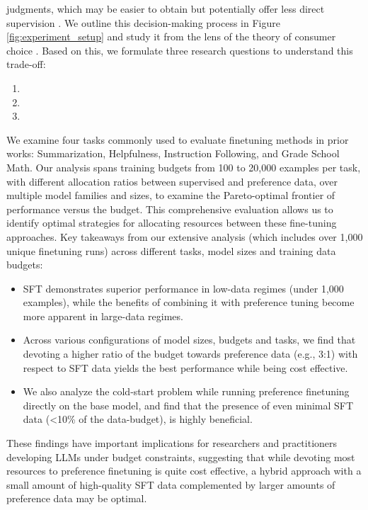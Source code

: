 judgments, which may be easier to obtain but potentially offer less direct supervision \citep{bai2022traininghelpfulharmlessassistant}. We outline this decision-making process in Figure \ref{fig:experiment_setup} and study it from the lens of the theory of consumer choice \citep{0458bef5-f1a5-33b9-8a87-02cfef6aa798, 721839b0-7fd6-3496-8a6f-a05763670acd}. Based on this, we formulate three research questions to understand this trade-off:

\begin{enumerate}
    \item \RQOne
    \item \RQTwo
    \item \RQThree
\end{enumerate}

We examine four tasks commonly used to evaluate finetuning methods in prior works: Summarization, Helpfulness, Instruction Following, and Grade School Math. Our analysis spans training budgets from 100 to 20,000 examples per task, with different allocation ratios between supervised and preference data, over multiple model families and sizes, to examine the Pareto-optimal frontier of performance versus the budget. This comprehensive evaluation allows us to identify optimal strategies for allocating resources between these fine-tuning approaches. Key takeaways from our extensive analysis (which includes over 1,000 unique finetuning runs) across different tasks, model sizes and training data budgets:

\begin{itemize}
    \item SFT demonstrates superior performance in low-data regimes (under 1,000 examples), while the benefits of combining it with preference tuning become more apparent in large-data regimes. 

    \item Across various configurations of model sizes, budgets and tasks, we find that devoting a higher ratio of the budget towards preference data (e.g., 3:1) with respect to SFT data yields the best performance while being cost effective. 

    \item We also analyze the cold-start problem while running preference finetuning directly on the base model, and find that the presence of even minimal SFT data (<10\% of the data-budget), is highly beneficial. 
    
\end{itemize}

These findings have important implications for researchers and practitioners developing LLMs under budget constraints, suggesting that while devoting most resources to preference finetuning is quite cost effective, a hybrid approach with a small amount of high-quality SFT data complemented by larger amounts of preference data may be optimal. 
